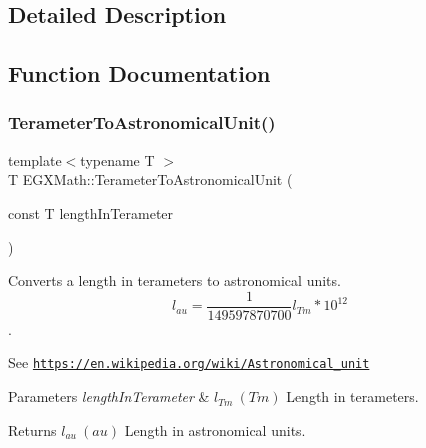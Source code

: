\subsection{Detailed Description}


\subsection{Function Documentation}
\mbox{\label{group___e_g_x_math-_conversions-_length_conversions-_s_i-_terameter-_astronomical_gaddabc91d53862a8031cd5438aedb0ed2}} 
\subsubsection{\texorpdfstring{Terameter\+To\+Astronomical\+Unit()}{TerameterToAstronomicalUnit()}}
{\footnotesize\ttfamily template$<$typename T $>$ \\
T E\+G\+X\+Math\+::\+Terameter\+To\+Astronomical\+Unit (\begin{DoxyParamCaption}\item[{const T}]{length\+In\+Terameter }\end{DoxyParamCaption})}



Converts a length in terameters to astronomical units. \[ l_{au}= \frac{1}{149597870700} l_{Tm} * 10^{12} \]. 

See \href{https://en.wikipedia.org/wiki/Astronomical_unit}{\tt https\+://en.\+wikipedia.\+org/wiki/\+Astronomical\+\_\+unit} 
\begin{DoxyParams}{Parameters}
{\em length\+In\+Terameter} & $ l_{Tm}\ (Tm)$ Length in terameters. \\
\hline
\end{DoxyParams}
\begin{DoxyReturn}{Returns}
$ l_{au}\ (au)$ Length in astronomical units. 
\end{DoxyReturn}
\mbox{\label{group___e_g_x_math-_conversions-_length_conversions-_s_i-_terameter-_astronomical_gaf8f6953b6ef57246e02ab136d74ee7a8}} 
